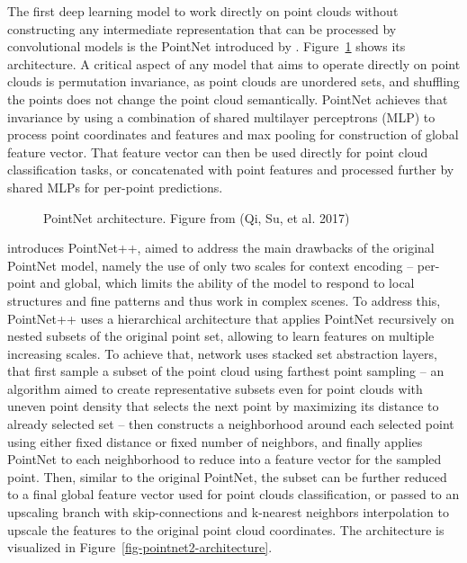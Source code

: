The first deep learning model to work directly on point clouds without constructing any intermediate representation that can be processed by convolutional models is the PointNet introduced by \citet{qiPointNet2017}.
Figure~\ref{fig-pointnet-architecture} shows its architecture.
A critical aspect of any model that aims to operate directly on point clouds is permutation invariance, as point clouds are unordered sets, and shuffling the points does not change the point cloud semantically.
PointNet achieves that invariance by using a combination of shared multilayer perceptrons (MLP) to process point coordinates and features and max pooling for construction of global feature vector.
That feature vector can then be used directly for point cloud classification tasks, or concatenated with point features and processed further by shared MLPs for per-point predictions.

\begin{figure}
\caption[PointNet architecture]{\label{fig-pointnet-architecture}PointNet architecture. Figure
from (Qi, Su, et al. 2017)}
\end{figure}

\citet{qiPointNetPlusPlus2017} introduces PointNet++, aimed to address the main drawbacks of the original PointNet model, namely the use of only two scales for context encoding – per-point and global, which limits the ability of the model to respond to local structures and fine patterns and thus work in complex scenes.
To address this, PointNet++ uses a hierarchical architecture that applies PointNet recursively on nested subsets of the original point set, allowing to learn features on multiple increasing scales.
To achieve that, network uses stacked set abstraction layers, that first sample a subset of the point cloud using farthest point sampling – an algorithm aimed to create representative subsets even for point clouds with uneven point density that selects the next point by maximizing its distance to already selected set – then constructs a neighborhood around each selected point using either fixed distance or fixed number of neighbors, and finally applies PointNet to each neighborhood to reduce into a feature vector for the sampled point.
Then, similar to the original PointNet, the subset can be further reduced to a final global feature vector used for point clouds classification, or passed to an upscaling branch with skip-connections and k-nearest neighbors interpolation to upscale the features to the original point cloud coordinates.
The architecture is visualized in Figure~\ref{fig-pointnet2-architecture}.

